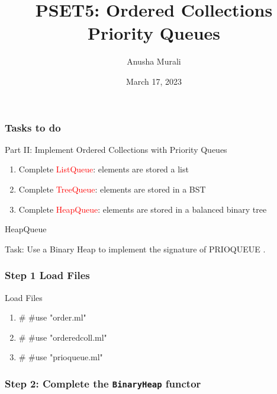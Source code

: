 \documentclass{beamer}
\title{PSET5: Ordered Collections \\ Priority Queues}
\date{March 17, 2023}
\author{Anusha Murali}
\begin{document}

\begin{frame}[fragile]
\titlepage

\end{frame}


\begin{frame}[fragile]
\frametitle{Tasks to do}

\begin{block}{Part II: Implement Ordered Collections with Priority Queues}
\begin{enumerate}
\item Complete \textcolor{red}{ListQueue}: elements are stored a list
\item Complete \textcolor{red}{TreeQueue}: elements are stored in a BST
\item Complete \textcolor{red}{HeapQueue}: elements are stored in a balanced binary tree
\end{enumerate}
\end{block}
\end{frame}


\begin{frame}[fragile]

\vspace*{0.5in}

\centerline{\huge HeapQueue}

\vspace*{0.2in}
\begin{center}
Task: Use a Binary Heap to implement the signature of PRIOQUEUE .
\end{center}

\end{frame}





\begin{frame}[fragile]
\frametitle{Step 1 Load Files}

\begin{block}{Load Files}
\begin{enumerate}
\item \# \#use "order.ml"
\item \# \#use "orderedcoll.ml"
\item \# \#use "prioqueue.ml"
\end{enumerate}
\end{block}
\end{frame}


\frame[fragile]
\frametitle{Step 2: Complete the {\tt BinaryHeap} functor}
\end{document}
